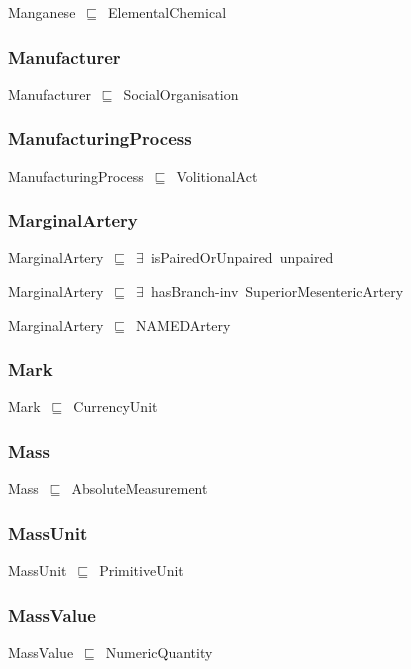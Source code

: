 \documentclass{article}
\begin{document}
Manganese~\ensuremath{\sqsubseteq}~ElementalChemical~

\subsubsection*{Manufacturer}

Manufacturer~\ensuremath{\sqsubseteq}~SocialOrganisation~

\subsubsection*{ManufacturingProcess}

ManufacturingProcess~\ensuremath{\sqsubseteq}~VolitionalAct~

\subsubsection*{MarginalArtery}

MarginalArtery~\ensuremath{\sqsubseteq}~\ensuremath{\exists}~isPairedOrUnpaired~unpaired~

MarginalArtery~\ensuremath{\sqsubseteq}~\ensuremath{\exists}~hasBranch-inv~SuperiorMesentericArtery~

MarginalArtery~\ensuremath{\sqsubseteq}~NAMEDArtery~

\subsubsection*{Mark}

Mark~\ensuremath{\sqsubseteq}~CurrencyUnit~

\subsubsection*{Mass}

Mass~\ensuremath{\sqsubseteq}~AbsoluteMeasurement~

\subsubsection*{MassUnit}

MassUnit~\ensuremath{\sqsubseteq}~PrimitiveUnit~

\subsubsection*{MassValue}

MassValue~\ensuremath{\sqsubseteq}~NumericQuantity~
\end{document}

